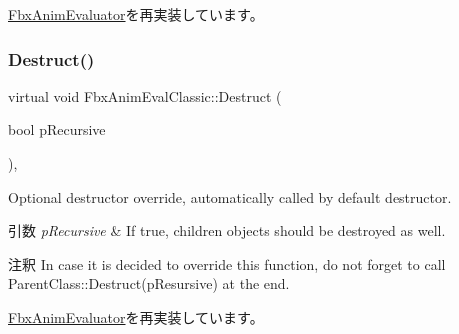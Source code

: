 \hyperlink{class_fbx_anim_evaluator_a9f167a7fd55aa593d191fdf014c1b3bd}{Fbx\+Anim\+Evaluator}を再実装しています。

\mbox{\label{class_fbx_anim_eval_classic_a308a42f3bd439a3e36f3b5171d5fc092}} 
\subsubsection{\texorpdfstring{Destruct()}{Destruct()}}
{\footnotesize\ttfamily virtual void Fbx\+Anim\+Eval\+Classic\+::\+Destruct (\begin{DoxyParamCaption}\item[{bool}]{p\+Recursive }\end{DoxyParamCaption})\hspace{0.3cm}{\ttfamily [protected]}, {\ttfamily [virtual]}}

Optional destructor override, automatically called by default destructor. 
\begin{DoxyParams}{引数}
{\em p\+Recursive} & If true, children objects should be destroyed as well. \\
\hline
\end{DoxyParams}
\begin{DoxyRemark}{注釈}
In case it is decided to override this function, do not forget to call Parent\+Class\+::\+Destruct(p\+Resursive) at the end. 
\end{DoxyRemark}


\hyperlink{class_fbx_anim_evaluator_ac425dd202ceb6c0e5adfc86d8c901dd0}{Fbx\+Anim\+Evaluator}を再実装しています。

\mbox{\label{class_fbx_anim_eval_classic_a83f7c6d89964e4ff48e7ad2d325a1eac}} 
